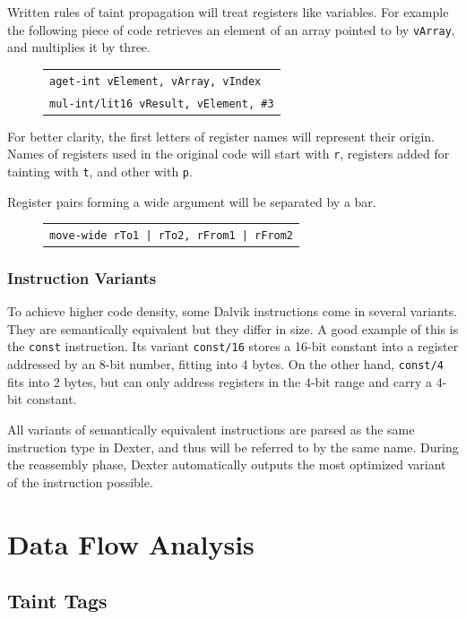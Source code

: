\documentclass[12pt,twoside,notitlepage]{report}
\newcommand{\centerbox}[1] {
	\begin{center}
	\begin{footnotesize}
	\begin{tabular}{l}
		#1
	\end{tabular}
	\end{footnotesize}
	\end{center}
}
\newcommand{\asm}[1] {\texttt{#1}}
\begin{document}
Written rules of taint propagation will treat registers like variables. For example the following piece of code retrieves an element of an array pointed to by \verb$vArray$, and multiplies it by three.
	\begin{figure}[H]
		\centerbox{
			\asm{aget-int vElement, vArray, vIndex} \\
			\asm{mul-int/lit16 vResult, vElement, \#3}
		}
	\end{figure}

For better clarity, the first letters of register names will represent their origin. Names of registers used in the original code will start with \verb$r$, registers added for tainting with \verb$t$, and other with \verb$p$.

Register pairs forming a wide argument will be separated by a bar.
	\begin{figure}[H]
		\centerbox{
			\asm{move-wide rTo1 | rTo2, rFrom1 | rFrom2}
		}
	\end{figure}

\subsubsection{Instruction Variants}

To achieve higher code density, some Dalvik instructions come in several variants. They are semantically equivalent but they differ in size. A good example of this is the \verb$const$ instruction. Its variant \verb$const/16$ stores a 16-bit constant into a register addressed by an 8-bit number, fitting into 4 bytes. On the other hand, \verb$const/4$ fits into 2 bytes, but can only address registers in the 4-bit range and carry a 4-bit constant.

All variants of semantically equivalent instructions are parsed as the same instruction type in Dexter, and thus will be referred to  by the same name. During the reassembly phase, Dexter automatically outputs the most optimized variant of the instruction possible.

\section{Data Flow Analysis}
\label{section:DataFlowAnalysis}

\subsection{Taint Tags}
\end{document}
